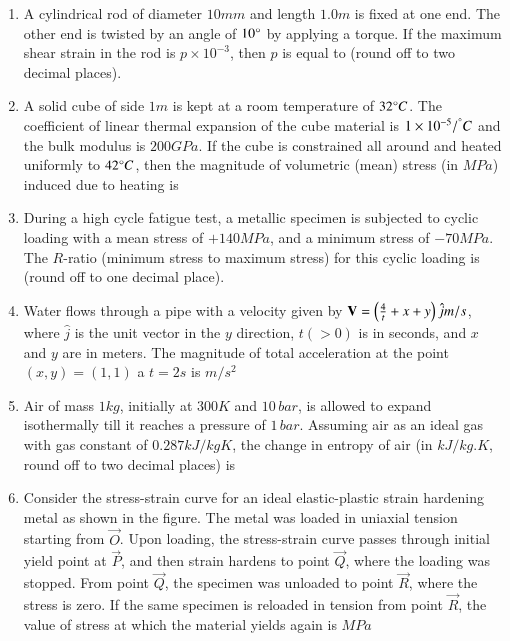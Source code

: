 \documentclass[journal]{IEEEtran}
\begin{document}
\begin{enumerate}
    \item  A cylindrical rod of diameter $10 mm$ and length $1.0 m$ is fixed at one end. The other end is twisted by an angle of $10\degree$ by applying a torque. If the maximum shear strain in the rod is $p\times10^{-3}$, then $p$ is equal to \underline{\hspace{1cm}} (round off to two decimal places).

    \item A solid cube of side $1 m$ is kept at a room temperature of $32 \degree C$. The coefficient of linear thermal expansion of the cube material is $1\times 10^{-5}/{}^{\degree} C$ and the bulk modulus is $200 GPa$. If the cube is constrained all around and heated uniformly to $42 \degree C$, then the magnitude of volumetric (mean) stress (in $MPa$) induced due to heating is \underline{\hspace{1cm}}

    \item During a high cycle fatigue test, a metallic specimen is subjected to cyclic loading with a mean stress of $+140 MPa$, and a minimum stress of $-70 MPa$. The $R$-ratio (minimum stress to maximum stress) for this cyclic loading is \underline{\hspace{1cm}} (round off to one decimal place).

    \item Water flows through a pipe with a velocity given by $\mathbf{V} = \left(\frac{4}{t}+x+y\right)\hat{j}m/s$, where $\hat{j}$ is the unit vector in the $y$ direction, $t (> 0)$ is in seconds, and $x$ and $y$ are in meters. The magnitude of total acceleration at the point $(x, y) = (1, 1)$ a $t = 2 s$ is \underline{\hspace{1cm}} $m/s^2$

    \item Air of mass $1 kg$, initially at $300 K$ and $10\,bar$, is allowed to expand isothermally till it reaches a pressure of $1\,bar$. Assuming air as an ideal gas with gas constant of $0.287 kJ/kg K$, the change in entropy of air (in $kJ/kg.K$, round off to two decimal places) is \underline{\hspace{1cm}}

    \item Consider the stress-strain curve for an ideal elastic-plastic strain hardening metal as shown in the figure. The metal was loaded in uniaxial tension starting from $\vec{O}$. Upon loading, the stress-strain curve passes through initial yield point at $\vec{P}$, and then strain hardens to point $\vec{Q}$, where the loading was stopped. From point $\vec{Q}$, the specimen was unloaded to point $\vec{R}$, where the stress is zero. If the same specimen is reloaded in tension from point $\vec{R}$, the value of stress at which the material yields again is \underline{\hspace{1cm}} $MPa$
        \begin{figure}[!ht]
            \centering
            
        \end{figure}


\end{enumerate}
\end{document}
